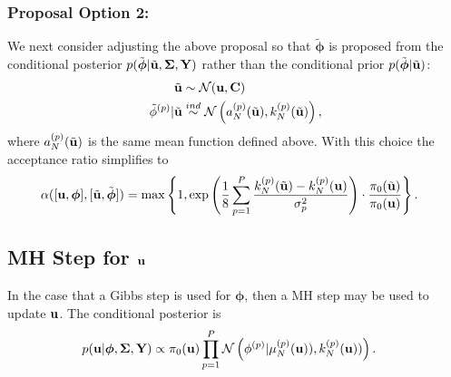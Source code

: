 \documentclass[12pt]{article}
\newcommand{\bphi}{\boldsymbol{\phi}}
\begin{document}
\subsubsection{Proposal Option 2:}
We next consider adjusting the above proposal so that $\tilde{\bphi}$ is proposed from the conditional posterior $p(\tilde{\bphi}|\tilde{\bpar}, \CovObs, \stateMat)$ rather than the 
conditional prior $p(\tilde{\bphi}|\tilde{\bpar})$:
\begin{align*}
\tilde{\mathbf{u}} &\sim \mathcal{N}(\mathbf{u}, \mathbf{C}) \\
{\tilde{\phi}}^{(p)}|\tilde{\mathbf{u}} &\overset{ind}{\sim} \mathcal{N}\left({a}^{(p)}_{N}(\tilde{\mathbf{u}}), k_{N}^{(p)}(\tilde{\mathbf{u}})\right), 
\end{align*}
where ${a}^{(p)}_{N}(\tilde{\mathbf{u}})$ is the same mean function defined above. With this choice the acceptance ratio simplifies to 
\begin{align*}
\accProbMH([\bpar, \bphi], [\tilde{\bpar}, \tilde{\bphi}]) 
&= \max\left\{1, \exp\left(\frac{1}{8}  \sum_{\objIdx=1}^{\Nobj} \frac{\GPKerPredOut{\Ndesign}{\objIdx}(\tilde{\bpar}) - \GPKerPredOut{\Ndesign}{\objIdx}(\bpar)}{\sigma^2_{\objIdx}} \right) \cdot \frac{\priorDens(\tilde{\bpar})}{\priorDens(\bpar)} \right\}.
\end{align*}


\subsection{MH Step for $\mathbf{u}$}
In the case that a Gibbs step is used for $\bphi$, then a MH step may be used to update $\mathbf{u}$. The conditional posterior is 
\begin{align*}
p(\bpar | \bphi, \CovObs, \stateMat) 
&\propto \priorDens(\bpar) \prod_{\objIdx=1}^{\Nobj} \Gaussian\left(\indexObj{\phi} | \GPMeanPredOut{\Ndesign}{\objIdx}(\bpar)), \GPKerPredOut{\Ndesign}{\objIdx}(\bpar))\right).
\end{align*}


\end{document}
